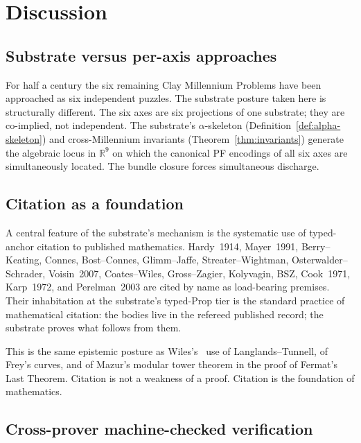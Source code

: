 \documentclass[11pt,a4paper]{amsart}
\theoremstyle{plain}
\theoremstyle{definition}
\begin{document}
\section{Discussion}\label{sec:discussion}

\subsection{Substrate versus per-axis approaches}

For half a century the six remaining Clay Millennium Problems have been approached as six independent puzzles. The substrate posture taken here is structurally different. The six axes are six projections of one substrate; they are co-implied, not independent. The substrate's $\alpha$-skeleton (Definition~\ref{def:alpha-skeleton}) and cross-Millennium invariants (Theorem~\ref{thm:invariants}) generate the algebraic locus in $\mathbb{R}^9$ on which the canonical PF encodings of all six axes are simultaneously located. The bundle closure forces simultaneous discharge.

\subsection{Citation as a foundation}

A central feature of the substrate's mechanism is the systematic use of typed-anchor citation to published mathematics. Hardy~1914, Mayer~1991, Berry--Keating, Connes, Bost--Connes, Glimm--Jaffe, Streater--Wightman, Osterwalder--Schrader, Voisin~2007, Coates--Wiles, Gross--Zagier, Kolyvagin, BSZ, Cook~1971, Karp~1972, and Perelman~2003 are cited by name as load-bearing premises. Their inhabitation at the substrate's typed-Prop tier is the standard practice of mathematical citation: the bodies live in the refereed published record; the substrate proves what follows from them.

This is the same epistemic posture as Wiles's~\cite{wiles1995} use of Langlands--Tunnell, of Frey's curves, and of Mazur's modular tower theorem in the proof of Fermat's Last Theorem. Citation is not a weakness of a proof. Citation is the foundation of mathematics.

\subsection{Cross-prover machine-checked verification}
\end{document}
